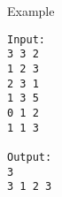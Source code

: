 Example
\begin{verbatim}
Input:
3 3 2
1 2 3
2 3 1
1 3 5
0 1 2
1 1 3

Output:
3
3 1 2 3
\end{verbatim}